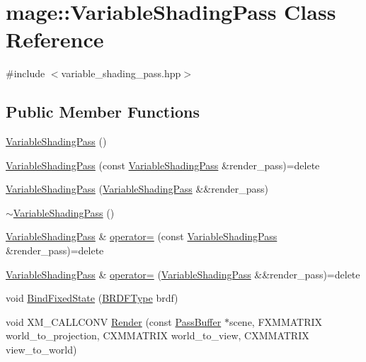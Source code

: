 \hypertarget{classmage_1_1_variable_shading_pass}{}\section{mage\+:\+:Variable\+Shading\+Pass Class Reference}
\label{classmage_1_1_variable_shading_pass}


{\ttfamily \#include $<$variable\+\_\+shading\+\_\+pass.\+hpp$>$}

\subsection*{Public Member Functions}
\begin{DoxyCompactItemize}
\item 
\hyperlink{classmage_1_1_variable_shading_pass_a0c3b30167c1dcdf74daae080f2c799bc}{Variable\+Shading\+Pass} ()
\item 
\hyperlink{classmage_1_1_variable_shading_pass_a98ce8bacba3894ff29d2a13d3a645d22}{Variable\+Shading\+Pass} (const \hyperlink{classmage_1_1_variable_shading_pass}{Variable\+Shading\+Pass} \&render\+\_\+pass)=delete
\item 
\hyperlink{classmage_1_1_variable_shading_pass_afcb297b4d400a6eb119846d4c04fc3d1}{Variable\+Shading\+Pass} (\hyperlink{classmage_1_1_variable_shading_pass}{Variable\+Shading\+Pass} \&\&render\+\_\+pass)
\item 
\hyperlink{classmage_1_1_variable_shading_pass_a1af7915285b239e8e6d14eb0f926dc4a}{$\sim$\+Variable\+Shading\+Pass} ()
\item 
\hyperlink{classmage_1_1_variable_shading_pass}{Variable\+Shading\+Pass} \& \hyperlink{classmage_1_1_variable_shading_pass_ad846c4f7ffc5b795ba1c0fa03bd6c2af}{operator=} (const \hyperlink{classmage_1_1_variable_shading_pass}{Variable\+Shading\+Pass} \&render\+\_\+pass)=delete
\item 
\hyperlink{classmage_1_1_variable_shading_pass}{Variable\+Shading\+Pass} \& \hyperlink{classmage_1_1_variable_shading_pass_a28702f255ccbbabd4b6e3177acd97a8b}{operator=} (\hyperlink{classmage_1_1_variable_shading_pass}{Variable\+Shading\+Pass} \&\&render\+\_\+pass)=delete
\item 
void \hyperlink{classmage_1_1_variable_shading_pass_a3a5bf4764bdafd393c73b75939f68aa0}{Bind\+Fixed\+State} (\hyperlink{namespacemage_ae7a7a03a7b34d7e2689689bb8295cd38}{B\+R\+D\+F\+Type} brdf)
\item 
void X\+M\+\_\+\+C\+A\+L\+L\+C\+O\+NV \hyperlink{classmage_1_1_variable_shading_pass_a24ff5ae8eec4f4adc08b62c01c56aa52}{Render} (const \hyperlink{structmage_1_1_pass_buffer}{Pass\+Buffer} $\ast$scene, F\+X\+M\+M\+A\+T\+R\+IX world\+\_\+to\+\_\+projection, C\+X\+M\+M\+A\+T\+R\+IX world\+\_\+to\+\_\+view, C\+X\+M\+M\+A\+T\+R\+IX view\+\_\+to\+\_\+world)

\end{DoxyCompactItemize}
